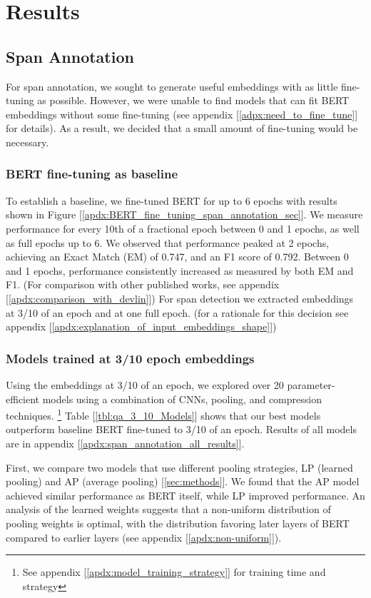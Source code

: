 \section{Results}

\subsection{Span Annotation}
For span annotation, we sought to generate useful embeddings with as little fine-tuning as possible. However, we were unable to find models that can fit BERT embeddings without some fine-tuning (see appendix [\ref{adpx:need_to_fine_tune}] for details). As a result, we decided that a small amount of fine-tuning would be necessary.

\subsubsection{BERT fine-tuning as baseline}
To establish a baseline, we fine-tuned BERT for up to 6 epochs with results shown in Figure [\ref{apdx:BERT_fine_tuning_span_annotation_sec}]. We measure performance for every 10th of a fractional epoch between 0 and 1 epochs, as well as full epochs up to 6. We observed that performance peaked at 2 epochs, achieving an Exact Match (EM) of 0.747, and an F1 score of 0.792. Between 0 and 1 epochs, performance consistently increased as measured by  both EM and F1. (For comparison with other published works, see appendix [\ref{apdx:comparison_with_devlin}]) For span detection we extracted embeddings at 3/10 of an epoch and at one full epoch. (for a rationale for this decision see appendix [\ref{apdx:explanation_of_input_embeddings_shape}])

\subsubsection{Models trained at 3/10 epoch embeddings}
Using the embeddings at 3/10 of an epoch, we explored over 20 parameter-efficient models using a combination of CNNs, pooling, and compression techniques. \footnote{See appendix [\ref{apdx:model_training_strategy}] for training time and strategy} Table [\ref{tbl:qa_3_10_Models}] shows that our best models outperform baseline BERT fine-tuned to 3/10 of an epoch. Results of all models are in appendix [\ref{apdx:span_annotation_all_results}].

First, we compare two models that use different pooling strategies, LP (learned pooling) and AP (average pooling) [\ref{sec:methods}]. We found that the AP model achieved similar performance as BERT itself, while LP improved performance. An analysis of the learned weights suggests that a non-uniform distribution of pooling weights is optimal, with the distribution favoring later layers of BERT compared to earlier layers (see appendix [\ref{apdx:non-uniform}]).

